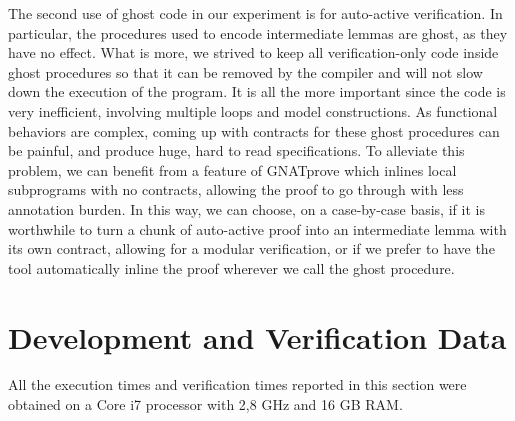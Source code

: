 \documentclass{llncs}
\newcommand{\gnatprove}{GNATprove\xspace}
\begin{document}


The second use of ghost code in our experiment is for auto-active verification. In particular, the procedures
used to encode intermediate lemmas are ghost, as they have no effect. What is more, we strived to
keep all verification-only code inside ghost procedures so that it can be removed by the compiler and will not
slow down the execution of the program. It is all the more important since the code is very inefficient, involving
multiple loops and model constructions. As functional behaviors are complex, coming up with contracts for
these ghost procedures can be painful, and produce huge, hard to read specifications. To alleviate this
problem, we can benefit from a feature of \gnatprove which inlines local subprograms with no contracts, allowing
the proof to go through with less annotation burden. In this way, we can choose, on a case-by-case basis, if
it is worthwhile to turn a chunk of auto-active proof into an intermediate lemma with its own contract,
allowing for a modular verification, or if we prefer to have the tool automatically inline the
proof wherever we call the ghost procedure.


\section{Development and Verification Data}

All the execution times and verification times reported in this section were
obtained on a Core i7 processor with 2,8 GHz and 16 GB RAM.
\end{document}
